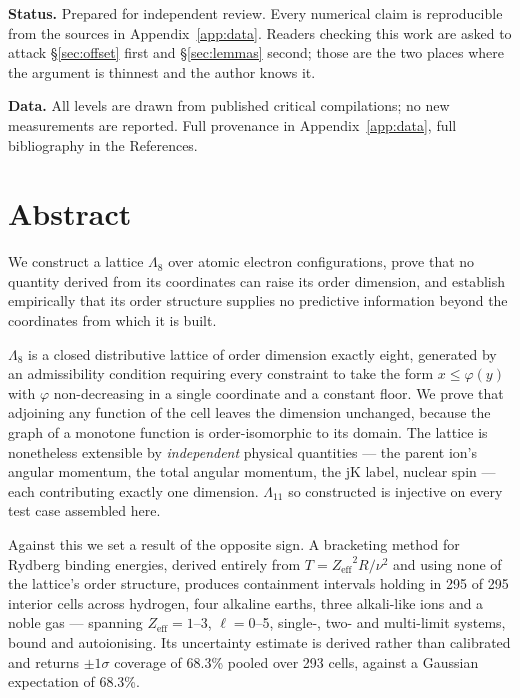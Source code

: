 \documentclass[11pt,a4paper]{article}
\theoremstyle{definition}
\newcommand{\Lm}{\ensuremath{\Lambda}}
\newcommand{\Le}{\ensuremath{\Lambda_{8}}}
\newcommand{\Zeff}{\ensuremath{Z_{\mathrm{eff}}}}
\begin{document}
\begin{titlepage}
{\noindent\small\color{mut}
\textbf{Status.} Prepared for independent review. Every numerical claim is
reproducible from the sources in Appendix~\ref{app:data}. Readers checking this
work are asked to attack \S\ref{sec:offset} first and \S\ref{sec:lemmas}
second; those are the two places where the argument is thinnest and the author
knows it.\par
\vspace{2mm}
\textbf{Data.} All levels are drawn from published critical compilations; no new
measurements are reported. Full provenance in Appendix~\ref{app:data}, full
bibliography in the References.\par}
\end{titlepage}

\section*{Abstract}
\small
We construct a lattice \Le{} over atomic electron configurations, prove that no
quantity derived from its coordinates can raise its order dimension, and
establish empirically that its order structure supplies no predictive
information beyond the coordinates from which it is built.

\Le{} is a closed distributive lattice of order dimension exactly eight,
generated by an admissibility condition requiring every constraint to take the
form $x \le \varphi(y)$ with $\varphi$ non-decreasing in a single coordinate and
a constant floor. We prove that adjoining any function of the cell leaves the
dimension unchanged, because the graph of a monotone function is
order-isomorphic to its domain. The lattice is nonetheless extensible by
\emph{independent} physical quantities --- the parent ion's angular momentum,
the total angular momentum, the jK label, nuclear spin --- each contributing
exactly one dimension. \Lm$_{11}$ so constructed is injective on every test case
assembled here.

Against this we set a result of the opposite sign. A bracketing method for
Rydberg binding energies, derived entirely from $T=\Zeff^{2}R/\nu^{2}$ and using
none of the lattice's order structure, produces containment intervals holding in
295 of 295 interior cells across hydrogen, four alkaline earths, three
alkali-like ions and a noble gas --- spanning $\Zeff = 1$--3, $\ell = 0$--5,
single-, two- and multi-limit systems, bound and autoionising. Its uncertainty
estimate is derived rather than calibrated and returns $\pm1\sigma$ coverage of
68.3\% pooled over 293 cells, against a Gaussian expectation of 68.3\%.
\end{document}
